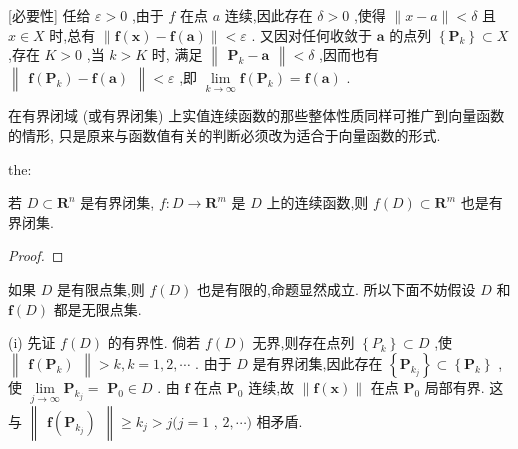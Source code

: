 [必要性] 任给 \(\varepsilon  > 0\) ,由于 \(f\) 在点 \(a\) 连续,因此存在 \(\delta  > 0\) ,使得 \(\parallel x - a\parallel  < \delta\) 且 \(x \in  X\) 时,总有 \(\parallel \mathbf{f}\left( \mathbf{x}\right)  - \mathbf{f}\left( \mathbf{a}\right) \parallel  < \varepsilon\) . 又因对任何收敛于 \(\mathbf{a}\) 的点列 \(\left\{  {\mathbf{P}}_{k}\right\}   \subset  X\) ,存在 \(K > 0\) ,当 \(k > K\) 时, 满足 \(\begin{Vmatrix}{{\mathbf{P}}_{k} - \mathbf{a}}\end{Vmatrix} < \delta\) ,因而也有 \(\begin{Vmatrix}{\mathbf{f}\left( {\mathbf{P}}_{k}\right)  - \mathbf{f}\left( \mathbf{a}\right) }\end{Vmatrix} < \varepsilon\) ,即 \(\mathop{\lim }\limits_{{k \rightarrow  \infty }}\mathbf{f}\left( {\mathbf{P}}_{k}\right)  = \mathbf{f}\left( \mathbf{a}\right)\) .

在有界闭域 (或有界闭集) 上实值连续函数的那些整体性质同样可推广到向量函数的情形, 只是原来与函数值有关的判断必须改为适合于向量函数的形式.

\begin{theorem}{}{the:}

\end{theorem}
 若 \(D \subset  {\mathbf{R}}^{n}\) 是有界闭集, \(f : D \rightarrow  {\mathbf{R}}^{m}\) 是 \(D\) 上的连续函数,则 \(f\left( D\right)  \subset  {\mathbf{R}}^{m}\) 也是有界闭集.

\begin{proof}

\end{proof}
如果 \(D\) 是有限点集,则 \(f\left( D\right)\) 也是有限的,命题显然成立. 所以下面不妨假设 \(D\) 和 \(\mathbf{f}\left( D\right)\) 都是无限点集.

(i) 先证 \(f\left( D\right)\) 的有界性. 倘若 \(f\left( D\right)\) 无界,则存在点列 \(\left\{  {P}_{k}\right\}   \subset  D\) ,使 \(\begin{Vmatrix}{\mathbf{f}\left( {\mathbf{P}}_{k}\right) }\end{Vmatrix} > k,k = 1,2,\cdots\) . 由于 \(D\) 是有界闭集,因此存在 \(\left\{  {\mathbf{P}}_{{k}_{j}}\right\}   \subset  \left\{  {\mathbf{P}}_{k}\right\}\) ,使 \(\mathop{\lim }\limits_{{j \rightarrow  \infty }}{\mathbf{P}}_{{k}_{j}} =\)  \({\mathbf{P}}_{0} \in  D\) . 由 \(\mathbf{f}\) 在点 \({\mathbf{P}}_{0}\) 连续,故 \(\parallel \mathbf{f}\left( \mathbf{x}\right) \parallel\) 在点 \({\mathbf{P}}_{0}\) 局部有界. 这与 \(\begin{Vmatrix}{\mathbf{f}\left( {\mathbf{P}}_{{k}_{j}}\right) }\end{Vmatrix} \geq  {k}_{j} > j(j = 1\) , \(2,\cdots )\) 相矛盾.

